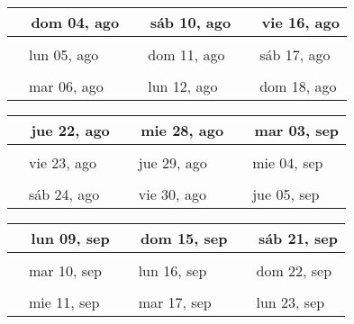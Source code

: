 \documentclass[letterpaper,10pt]{article}
\begin{document}
\begin{tabular}{lll}
\\
{\ \ dom 04, ago\hspace{4.5cm}\vspace{2.25cm}} &{\ \ sáb 10, ago\hspace{4.5cm}} &{\ \ vie 16, ago\hspace{4.5cm}}
\\ \hline \\
{\ \ lun 05, ago\vspace{2.25cm}} & {\ \ dom 11, ago} & {\ \ sáb 17, ago}
\\ \hline \\
{\ \ mar 06, ago\vspace{2.25cm}} & {\ \ lun 12, ago} & {\ \ dom 18, ago}
\\
\end{tabular}\par
\begin{tabular}{lll}
\\
{\ \ jue 22, ago\hspace{4.5cm}\vspace{2.25cm}} &{\ \ mie 28, ago\hspace{4.5cm}} &{\ \ mar 03, sep\hspace{4.5cm}}
\\ \hline \\
{\ \ vie 23, ago\vspace{2.25cm}} & {\ \ jue 29, ago} & {\ \ mie 04, sep}
\\ \hline \\
{\ \ sáb 24, ago\vspace{2.25cm}} & {\ \ vie 30, ago} & {\ \ jue 05, sep}
\\
\end{tabular}\par
\begin{tabular}{lll}
\\
{\ \ lun 09, sep\hspace{4.5cm}\vspace{2.25cm}} &{\ \ dom 15, sep\hspace{4.5cm}} &{\ \ sáb 21, sep\hspace{4.5cm}}
\\ \hline \\
{\ \ mar 10, sep\vspace{2.25cm}} & {\ \ lun 16, sep} & {\ \ dom 22, sep}
\\ \hline \\
{\ \ mie 11, sep\vspace{2.25cm}} & {\ \ mar 17, sep} & {\ \ lun 23, sep}
\\
\end{tabular}\par
\end{document}
